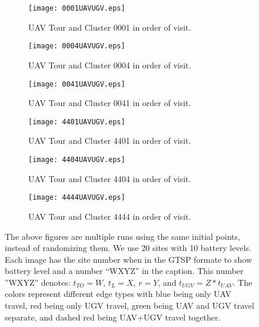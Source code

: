 \documentclass[letterpaper,10pt,conference]{ieeeconf}
\begin{document}
\begin{figure*}[ht]
\centering
\begin{subfigure}[b]{0.3\textwidth}
\texttt{[image: 0001UAVUGV.eps]}
\caption{UAV Tour and Cluster 0001 in order of visit.}
\label{fig:0001}
\end{subfigure}
\begin{subfigure}[b]{0.3\textwidth}
\texttt{[image: 0004UAVUGV.eps]}
\caption{UAV Tour and Cluster 0004 in order of visit.}
\label{fig:0004}
\end{subfigure}
\begin{subfigure}[b]{0.3\textwidth}
\texttt{[image: 0041UAVUGV.eps]}
\caption{UAV Tour and Cluster 0041 in order of visit.}
\label{fig:0041}
\end{subfigure}
\begin{subfigure}[b]{0.3\textwidth}
\texttt{[image: 4401UAVUGV.eps]}
\caption{UAV Tour and Cluster 4401 in order of visit.}
\label{fig:4401}
\end{subfigure}
\begin{subfigure}[b]{0.3\textwidth}
\texttt{[image: 4404UAVUGV.eps]}
\caption{UAV Tour and Cluster 4404 in order of visit.}
\label{fig:4404}
\end{subfigure}
\begin{subfigure}[b]{0.3\textwidth}
\texttt{[image: 4444UAVUGV.eps]}
\caption{UAV Tour and Cluster 4444 in order of visit.}
\label{fig:4444}
\end{subfigure}
\caption{The above figures are multiple runs using the same initial points, instead of randomizing them. We use 20 sites with 10 battery levels. Each image has the site number when in the GTSP formate to show battery level and a number ``WXYZ'' in the caption. This number ''WXYZ'' denotes: $t_{TO} = W$, $t_{L} = X$, $r = Y$, and $t_{UGV} = Z * t_{UAV}$. The colors represent different edge types with blue being only UAV travel, red being only UGV travel, green being UAV and UGV travel separate, and dashed red being UAV+UGV travel together. \label{fig:runs}}
\end{figure*}
\end{document}
